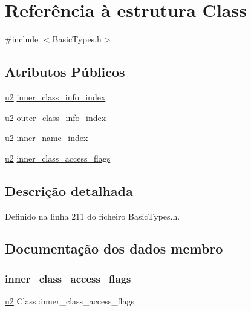 \hypertarget{structClass}{}\section{Referência à estrutura Class}
\label{structClass}


{\ttfamily \#include $<$Basic\+Types.\+h$>$}

\subsection*{Atributos Públicos}
\begin{DoxyCompactItemize}
\item 
\hyperlink{BasicTypes_8h_a732cde1300aafb73b0ea6c2558a7a54f}{u2} \hyperlink{structClass_a77e310982b1471782be2caf432cb9af0}{inner\+\_\+class\+\_\+info\+\_\+index}
\item 
\hyperlink{BasicTypes_8h_a732cde1300aafb73b0ea6c2558a7a54f}{u2} \hyperlink{structClass_a57bc4e6c8f985b9ee267d190e612dca8}{outer\+\_\+class\+\_\+info\+\_\+index}
\item 
\hyperlink{BasicTypes_8h_a732cde1300aafb73b0ea6c2558a7a54f}{u2} \hyperlink{structClass_a21dcd0b51d443a4cbaa870d658281105}{inner\+\_\+name\+\_\+index}
\item 
\hyperlink{BasicTypes_8h_a732cde1300aafb73b0ea6c2558a7a54f}{u2} \hyperlink{structClass_aa595adf631b8edac3b1de407bf03ad07}{inner\+\_\+class\+\_\+access\+\_\+flags}
\end{DoxyCompactItemize}


\subsection{Descrição detalhada}


Definido na linha 211 do ficheiro Basic\+Types.\+h.



\subsection{Documentação dos dados membro}
\mbox{\label{structClass_aa595adf631b8edac3b1de407bf03ad07}} 
\subsubsection{\texorpdfstring{inner\+\_\+class\+\_\+access\+\_\+flags}{inner\_class\_access\_flags}}
{\footnotesize\ttfamily \hyperlink{BasicTypes_8h_a732cde1300aafb73b0ea6c2558a7a54f}{u2} Class\+::inner\+\_\+class\+\_\+access\+\_\+flags}



